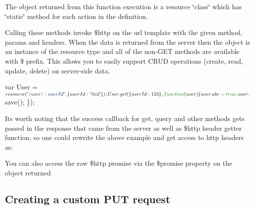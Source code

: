 \begin{DoxyItemize}
The object returned from this function execution is a resource \char`\"{}class\char`\"{} which has \char`\"{}static\char`\"{} method for each action in the definition.

Calling these methods invoke {\ttfamily \$http} on the {\ttfamily url} template with the given {\ttfamily method}, {\ttfamily params} and {\ttfamily headers}. When the data is returned from the server then the object is an instance of the resource type and all of the non-\/\+G\+E\+T methods are available with {\ttfamily \$} prefix. This allows you to easily support C\+R\+U\+D operations (create, read, update, delete) on server-\/side data.
\end{DoxyItemize}


\begin{DoxyCode}
var User = $resource(\textcolor{stringliteral}{'/user/:userId'}, \{userId:\textcolor{stringliteral}{'@id'}\});
User.get(\{userId:123\}, \textcolor{keyword}{function}(user) \{
  user.abc = \textcolor{keyword}{true};
  user.$save();
\});
\end{DoxyCode}


It\textquotesingle{}s worth noting that the success callback for {\ttfamily get}, {\ttfamily query} and other methods gets passed in the response that came from the server as well as \$http header getter function, so one could rewrite the above example and get access to http headers as\+:




You can also access the raw {\ttfamily \$http} promise via the {\ttfamily \$promise} property on the object returned




\subsection*{Creating a custom \textquotesingle{}P\+U\+T\textquotesingle{} request}

